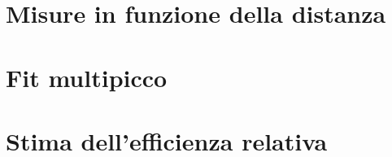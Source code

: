 \documentclass[twocolumn,10pt]{asme2ej}
\begin{document}
\clearpage
\section{Misure in funzione della distanza}\label{s:distanza}


\begin{table}[h ]
    \centering
    \caption{Dati fit per verifica della legge dell'inverso del quadrato della distanza}
    \label{t:distanza}
    \end{table}


\section{Fit multipicco}\label{s:multipicco}





\section{Stima dell'efficienza relativa}\label{s:efficienza}
\end{document}
